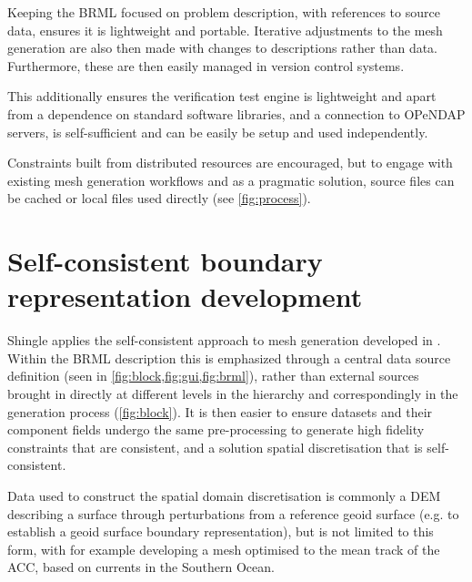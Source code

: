 \documentclass[a4paper, 10pt]{book}
\providecommand{\shingle}{Shingle\xspace}
\providecommand{\opendap}{OPeNDAP\xspace}
\providecommand{\brml}{BRML\xspace}
\providecommand{\brep}{boundary representation\xspace}
\begin{document}
Keeping the \brml focused on problem description, with references to source data,
ensures it is lightweight and portable.
%
Iterative adjustments to the mesh generation are also
then made with changes to descriptions rather than data.
%
Furthermore, these are then easily managed in version control systems.

This additionally ensures the verification test engine is lightweight
and apart from a dependence on standard software libraries,
and a connection to \opendap servers,
is self-sufficient
and can be easily be setup and used independently.

Constraints built from distributed resources are encouraged,
but to engage with existing mesh generation workflows and as a pragmatic solution, 
source files can be cached or local files used directly (see \cref{fig:process}).


\section{Self-consistent \brep development}
%
\shingle applies the self-consistent approach to mesh generation developed in \cite{candybrep}.
%
Within the \brml description this is emphasized 
through
a central
data source definition
(seen in \cref{fig:block,fig:gui,fig:brml}),
rather than external sources brought in directly
at different levels in the hierarchy
and correspondingly in the 
generation process (\cref{fig:block}).
%
It is then easier to ensure datasets and their component fields undergo the same pre-processing 
to generate high fidelity constraints that are consistent, and a solution spatial discretisation that is self-consistent.

Data used to construct the spatial domain discretisation
is commonly a DEM describing a surface through perturbations from a reference geoid surface
(e.g. to establish a geoid surface \brep),
but is not limited to this form, with for example \cite{candybrep}
developing a mesh optimised to the mean track of the ACC, based on currents in the Southern Ocean.
\end{document}
